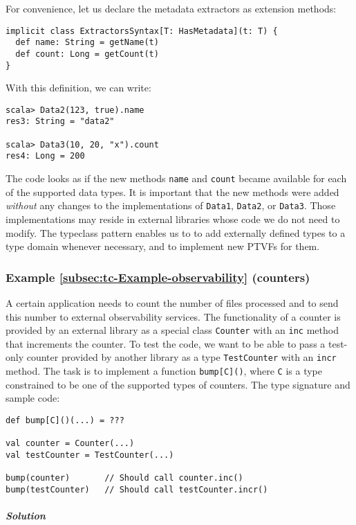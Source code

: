 For convenience, let us declare the metadata extractors as extension
methods:
\begin{lstlisting}
implicit class ExtractorsSyntax[T: HasMetadata](t: T) {
  def name: String = getName(t)
  def count: Long = getCount(t)
}
\end{lstlisting}
With this definition, we can write:
\begin{lstlisting}
scala> Data2(123, true).name
res3: String = "data2"

scala> Data3(10, 20, "x").count
res4: Long = 200
\end{lstlisting}
The code looks as if the new methods \lstinline!name! and \lstinline!count!
became available for each of the supported data types. It is important
that the new methods were added \emph{without} any changes to the
implementations of \lstinline!Data1!, \lstinline!Data2!, or \lstinline!Data3!.
Those implementations may reside in external libraries whose code
we do not need to modify. The typeclass pattern enables us to to add
externally defined types to a type domain whenever necessary, and
to implement new PTVFs for them.

\subsubsection{Example \label{subsec:tc-Example-observability}\ref{subsec:tc-Example-observability}
(counters)}

A certain application needs to count the number of files processed
and to send this number to external observability services. The functionality
of a counter is provided by an external library as a special class
\lstinline!Counter! with an \lstinline!inc! method that increments
the counter. To test the code, we want to be able to pass a test-only
counter provided by another library as a type \lstinline!TestCounter!
with an \lstinline!incr! method. The task is to implement a function
\lstinline!bump[C]()!, where \lstinline!C! is a type constrained
to be one of the supported types of counters. The type signature and
sample code:
\begin{lstlisting}
def bump[C]()(...) = ???

val counter = Counter(...)
val testCounter = TestCounter(...)

bump(counter)       // Should call counter.inc()
bump(testCounter)   // Should call testCounter.incr()
\end{lstlisting}


\subparagraph{Solution}

